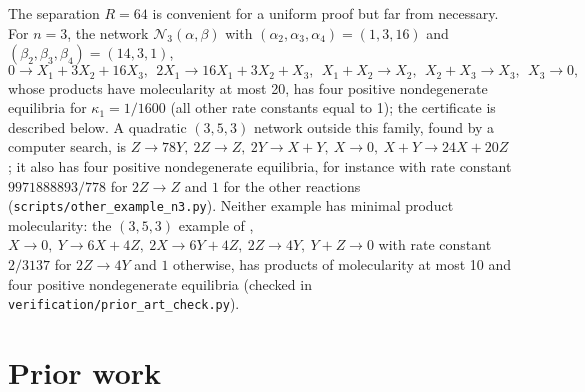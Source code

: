 \documentclass[11pt,a4paper]{report}
\newcommand{\Net}{\mathcal N}
\begin{document}
The separation \(R=64\) is convenient for a uniform proof but far from necessary. For \(n=3\), the network
\(\Net_3(\alpha,\beta)\) with \((\alpha_2,\alpha_3,\alpha_4)=(1,3,16)\) and \((\beta_2,\beta_3,\beta_4)=(14,3,1)\),
\[
0\to X_1+3X_2+16X_3,\ \ 2X_1\to16X_1+3X_2+X_3,\ \ X_1+X_2\to X_2,\ \ X_2+X_3\to X_3,\ \ X_3\to0,
\]
whose products have molecularity at most 20, has four positive nondegenerate equilibria for \(\kappa_1=1/1600\) (all
other rate constants equal to 1); the certificate is described below. A quadratic \((3,5,3)\) network
outside this family, found by a computer search, is \(Z\to78Y,\ 2Z\to Z,\ 2Y\to X+Y,\ X\to0,\ X+Y\to24X+20Z\); it also has
four positive nondegenerate equilibria, for instance with rate constant \(9971888893/778\) for \(2Z\to Z\) and \(1\) for
the other reactions (\texttt{scripts/other\_example\_n3.py}). Neither example has minimal product molecularity: the
\((3,5,3)\) example of \autocite{Anon2026}, \(X\to0,\ Y\to6X+4Z,\ 2X\to6Y+4Z,\ 2Z\to4Y,\ Y+Z\to0\) with rate constant
\(2/3137\) for \(2Z\to4Y\) and \(1\) otherwise, has products of molecularity at most 10 and four positive nondegenerate
equilibria (checked in \texttt{verification/prior\_art\_check.py}).

\section{Prior work}\label{sec:prior}
\end{document}

